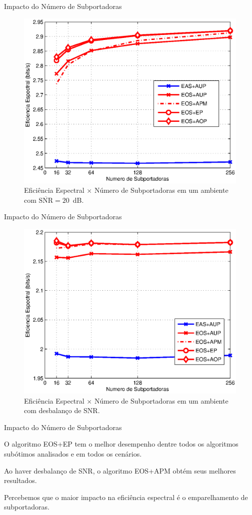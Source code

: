 \begin{frame}{Impacto do Número de Subportadoras}
   \begin{figure}[!htb]
     \centering
     \includegraphics[width=0.6\linewidth]{../Imagens/SNxSE-20dB.eps}
     \caption{Eficiência Espectral $\times$ Número de Subportadoras em um ambiente com $\overline{\text{SNR}} = 20$~dB.}\label{fig:SNxSE-20dB}
   \end{figure}
\end{frame}

\begin{frame}{Impacto do Número de Subportadoras}
   \begin{figure}[!htb]
     \centering
\includegraphics[width=0.6\linewidth]{../Imagens/SNxSE-Unbal-SNR.eps}
\caption{Eficiência Espectral $\times$ Número de Subportadoras em um ambiente com desbalanço de SNR.}\label{fig:SNxSE-Unbal-SNR}
   \end{figure}
\end{frame}

\begin{frame}{Impacto do Número de Subportadoras}
   \begin{bigitem}
      \item O algoritmo EOS+EP tem o melhor desempenho dentre todos os algoritmos subótimos analisados e em todos os cenários.
      \item Ao haver desbalanço de SNR, o algoritmo EOS+APM obtém seus melhores resultados.
      \item Percebemos que o maior impacto na eficiência espectral é o emparelhamento de subportadoras.
   \end{bigitem}
\end{frame}

